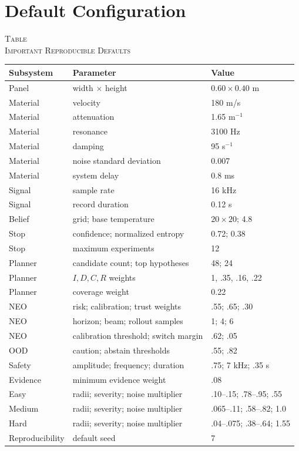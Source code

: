 \documentclass[conference]{IEEEtran}
\begin{document}
\section{Default Configuration}
\label{tab:defaults}
\begin{center}
\footnotesize
\textsc{Table }\\
\textsc{Important Reproducible Defaults}
\vspace{1mm}

\centering
\renewcommand{\arraystretch}{0.97}
\begin{tabular}{@{}L{0.20\columnwidth}L{0.43\columnwidth}L{0.27\columnwidth}@{}}
\toprule
Subsystem & Parameter & Value \\
\midrule
Panel & width $\times$ height & $0.60\times0.40$ m \\
Material & velocity & 180 m/s \\
Material & attenuation & 1.65 m$^{-1}$ \\
Material & resonance & 3100 Hz \\
Material & damping & 95 s$^{-1}$ \\
Material & noise standard deviation & 0.007 \\
Material & system delay & 0.8 ms \\
Signal & sample rate & 16 kHz \\
Signal & record duration & 0.12 s \\
Belief & grid; base temperature & $20\times20$; 4.8 \\
Stop & confidence; normalized entropy & 0.72; 0.38 \\
Stop & maximum experiments & 12 \\
Planner & candidate count; top hypotheses & 48; 24 \\
Planner & $I,D,C,R$ weights & 1, .35, .16, .22 \\
Planner & coverage weight & 0.22 \\
NEO & risk; calibration; trust weights & .55; .65; .30 \\
NEO & horizon; beam; rollout samples & 1; 4; 6 \\
NEO & calibration threshold; switch margin & .62; .05 \\
OOD & caution; abstain thresholds & .55; .82 \\
Safety & amplitude; frequency; duration & .75; 7 kHz; .35 s \\
Evidence & minimum evidence weight & .08 \\
Easy & radii; severity; noise multiplier & .10--.15; .78--.95; .55 \\
Medium & radii; severity; noise multiplier & .065--.11; .58--.82; 1.0 \\
Hard & radii; severity; noise multiplier & .04--.075; .38--.64; 1.55 \\
Reproducibility & default seed & 7 \\
\bottomrule
\end{tabular}
\end{center}
\end{document}
